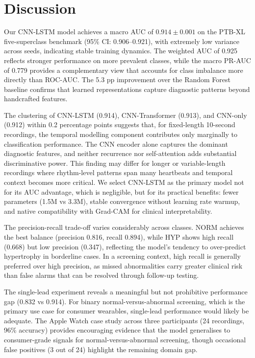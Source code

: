 \documentclass[10pt]{article}
\begin{document}
\section{Discussion}

Our CNN-LSTM model achieves a macro AUC of $0.914 \pm 0.001$ on the PTB-XL five-superclass benchmark (95\% CI: 0.906--0.921), with extremely low variance across seeds, indicating stable training dynamics. The weighted AUC of 0.925 reflects stronger performance on more prevalent classes, while the macro PR-AUC of 0.779 provides a complementary view that accounts for class imbalance more directly than ROC-AUC. The 5.3 pp improvement over the Random Forest baseline confirms that learned representations capture diagnostic patterns beyond handcrafted features.

The clustering of CNN-LSTM (0.914), CNN-Transformer (0.913), and CNN-only (0.912) within 0.2 percentage points suggests that, for fixed-length 10-second recordings, the temporal modelling component contributes only marginally to classification performance. The CNN encoder alone captures the dominant diagnostic features, and neither recurrence nor self-attention adds substantial discriminative power. This finding may differ for longer or variable-length recordings where rhythm-level patterns span many heartbeats and temporal context becomes more critical. We select CNN-LSTM as the primary model not for its AUC advantage, which is negligible, but for its practical benefits: fewer parameters (1.5M vs 3.3M), stable convergence without learning rate warmup, and native compatibility with Grad-CAM for clinical interpretability.

The precision-recall trade-off varies considerably across classes. NORM achieves the best balance (precision 0.816, recall 0.894), while HYP shows high recall (0.668) but low precision (0.347), reflecting the model's tendency to over-predict hypertrophy in borderline cases. In a screening context, high recall is generally preferred over high precision, as missed abnormalities carry greater clinical risk than false alarms that can be resolved through follow-up testing.

The single-lead experiment reveals a meaningful but not prohibitive performance gap (0.832 vs 0.914). For binary normal-versus-abnormal screening, which is the primary use case for consumer wearables, single-lead performance would likely be adequate. The Apple Watch case study across three participants (24 recordings, 96\% accuracy) provides encouraging evidence that the model generalises to consumer-grade signals for normal-versus-abnormal screening, though occasional false positives (3 out of 24) highlight the remaining domain gap.
\end{document}
